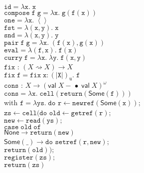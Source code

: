 \documentclass[nocopyrightspace,preprint]{sigplanconf}
\newcommand{\term}[1]{\ensuremath{\mathtt{{#1}}}}
\newcommand{\shrink}{\rightsquigarrow}
\newcommand{\unitval}{\left<\right>}
\newcommand{\interpu}[1]{(\!|{#1}|\!)_u}
\newcommand{\lollishrink}{-\!\!\!\,\bullet}
\newcommand{\valtype}[1]{\mathsf{val}\;{#1}}
\newcommand{\None}{\mathsf{None}}
\newcommand{\Some}[1]{\mathsf{Some}({#1})}
\newcommand{\fun}[2]{\lambda {#1}.\;{#2}}
\newcommand{\fix}[2]{\term{fix}\;{#1}.\;{#2}}
\begin{document}
\begin{figure}
{\small
\begin{tabbing}
\term{id = \fun{x}{x}} 
\\
\term{compose\;f\;g = \fun{x}{g(f(x))}}
\\
\term{one = \fun{x}{\unitval}}
\\
\term{fst = \fun{(x,y)}{x}}
\\
\term{snd = \fun{(x,y)}{y}}
\\
\term{pair\;f\;g = \fun{x}{(f(x),g(x))}}
\\
\term{eval = \fun{(f,x)}{f(x)}}
\\
\term{curry\;f = \fun{x}{\fun{y}{f(x,y)}}}
\\[0.5em]
\term{fix} : $(X \shrink X) \to X$ \\
\term{fix\; f = \fix{x:\interpu{X}}{f}}
\\[0.5em]

\term{cons} : $X \to (\valtype{X} \lollishrink \;\valtype{X})^\omega$ \\
\term{cons = \lambda x.\; cell(return(\Some{f}))} \\
with \term{f = \lambda ys.\;do} \= \term{r \leftarrow newref(\Some{x});} \\
\>     \term{zs \leftarrow cell(}\= 
      \term{do} \=\term{old \leftarrow getref(r);} \\
\> \> \> \term{new \leftarrow read(ys);} \\
\> \> \> \term{case\;old\;of} \\
\> \> \> \;\;\= \term{\None \to return(new)} \\
\> \> \> \>     \term{\Some{\_} \to do} \=\term{setref(r, new);} \\
\> \> \> \>  \>                           \term{return(old));} \\                 
\> \term{register(zs);} \\
\> \term{return(zs)}\\[0.5em]



\end{tabbing}}
\end{figure}
\end{document}
